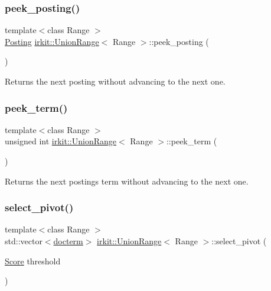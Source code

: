 \subsubsection{\texorpdfstring{peek\+\_\+posting()}{peek\_posting()}}
{\footnotesize\ttfamily template$<$class Range $>$ \\
\mbox{\hyperlink{classirkit_1_1UnionRange_a5f694970419f5a60d7fd41d740556229}{Posting}} \mbox{\hyperlink{classirkit_1_1UnionRange}{irkit\+::\+Union\+Range}}$<$ Range $>$\+::peek\+\_\+posting (\begin{DoxyParamCaption}{ }\end{DoxyParamCaption})\hspace{0.3cm}{\ttfamily [inline]}}



Returns the next posting without advancing to the next one. 

\mbox{\label{classirkit_1_1UnionRange_aa985f4985486d3df259be0c932340f18}} 
\subsubsection{\texorpdfstring{peek\+\_\+term()}{peek\_term()}}
{\footnotesize\ttfamily template$<$class Range $>$ \\
unsigned int \mbox{\hyperlink{classirkit_1_1UnionRange}{irkit\+::\+Union\+Range}}$<$ Range $>$\+::peek\+\_\+term (\begin{DoxyParamCaption}{ }\end{DoxyParamCaption})\hspace{0.3cm}{\ttfamily [inline]}}



Returns the next posting\textquotesingle{}s term without advancing to the next one. 

\mbox{\label{classirkit_1_1UnionRange_aacb1050fb1d624260c4013f4ba1939a6}} 
\subsubsection{\texorpdfstring{select\+\_\+pivot()}{select\_pivot()}}
{\footnotesize\ttfamily template$<$class Range $>$ \\
std\+::vector$<$\mbox{\hyperlink{structirkit_1_1UnionRange_1_1docterm}{docterm}}$>$ \mbox{\hyperlink{classirkit_1_1UnionRange}{irkit\+::\+Union\+Range}}$<$ Range $>$\+::select\+\_\+pivot (\begin{DoxyParamCaption}\item[{\mbox{\hyperlink{classirkit_1_1UnionRange_a47fb098a85581f5e33f4203e16245dae}{Score}}}]{threshold }\end{DoxyParamCaption})\hspace{0.3cm}{\ttfamily [inline]}}

